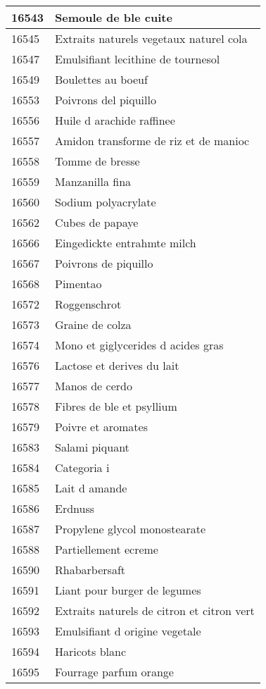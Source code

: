 \begin{longtable}{|l|l|}
16543 & Semoule de ble cuite \\ \hline 
16545 & Extraits naturels vegetaux naturel cola \\ \hline 
16547 & Emulsifiant lecithine de tournesol \\ \hline 
16549 & Boulettes au boeuf \\ \hline 
16553 & Poivrons del piquillo \\ \hline 
16556 & Huile d arachide raffinee \\ \hline 
16557 & Amidon transforme de riz et de manioc \\ \hline 
16558 & Tomme de bresse \\ \hline 
16559 & Manzanilla fina \\ \hline 
16560 & Sodium polyacrylate \\ \hline 
16562 & Cubes de papaye \\ \hline 
16566 & Eingedickte entrahmte milch \\ \hline 
16567 & Poivrons de piquillo \\ \hline 
16568 & Pimentao \\ \hline 
16572 & Roggenschrot \\ \hline 
16573 & Graine de colza \\ \hline 
16574 & Mono et giglycerides d acides gras \\ \hline 
16576 & Lactose et derives du lait \\ \hline 
16577 & Manos de cerdo \\ \hline 
16578 & Fibres de ble et psyllium \\ \hline 
16579 & Poivre et aromates \\ \hline 
16583 & Salami piquant \\ \hline 
16584 & Categoria i \\ \hline 
16585 & Lait d amande \\ \hline 
16586 & Erdnuss \\ \hline 
16587 & Propylene glycol monostearate \\ \hline 
16588 & Partiellement ecreme \\ \hline 
16590 & Rhabarbersaft \\ \hline 
16591 & Liant pour burger de legumes \\ \hline 
16592 & Extraits naturels de citron et citron vert \\ \hline 
16593 & Emulsifiant d origine vegetale \\ \hline 
16594 & Haricots blanc \\ \hline 
16595 & Fourrage parfum orange \\ \hline 

\end{longtable}
